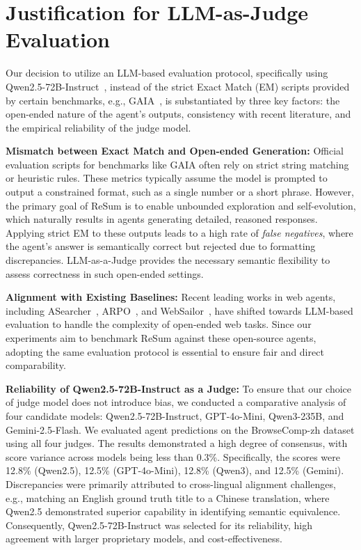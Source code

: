 \clearpage
\newpage

\section{Justification for LLM-as-Judge Evaluation}\label{appendix:llm-as-judge}

Our decision to utilize an LLM-based evaluation protocol, specifically using Qwen2.5-72B-Instruct~\citep{qwen2.5}, instead of the strict Exact Match (EM) scripts provided by certain benchmarks, e.g., GAIA~\citep{mialon2023gaia}, is substantiated by three key factors: the open-ended nature of the agent's outputs, consistency with recent literature, and the empirical reliability of the judge model.

\textbf{Mismatch between Exact Match and Open-ended Generation:} Official evaluation scripts for benchmarks like GAIA often rely on strict string matching or heuristic rules. These metrics typically assume the model is prompted to output a constrained format, such as a single number or a short phrase. However, the primary goal of ReSum is to enable unbounded exploration and self-evolution, which naturally results in agents generating detailed, reasoned responses. Applying strict EM to these outputs leads to a high rate of \textit{false negatives}, where the agent's answer is semantically correct but rejected due to formatting discrepancies. LLM-as-a-Judge provides the necessary semantic flexibility to assess correctness in such open-ended settings.

\textbf{Alignment with Existing Baselines:} Recent leading works in web agents, including ASearcher~\citep{gao2025asearcher}, ARPO~\citep{dong2025arpo}, and WebSailor~\citep{li2025websailor}, have shifted towards LLM-based evaluation to handle the complexity of open-ended web tasks. Since our experiments aim to benchmark ReSum against these open-source agents, adopting the same evaluation protocol is essential to ensure fair and direct comparability.

\textbf{Reliability of Qwen2.5-72B-Instruct as a Judge:} To ensure that our choice of judge model does not introduce bias, we conducted a comparative analysis of four candidate models: Qwen2.5-72B-Instruct, GPT-4o-Mini, Qwen3-235B, and Gemini-2.5-Flash. We evaluated agent predictions on the BrowseComp-zh dataset using all four judges. The results demonstrated a high degree of consensus, with score variance across models being less than 0.3\%. Specifically, the scores were 12.8\% (Qwen2.5), 12.5\% (GPT-4o-Mini), 12.8\% (Qwen3), and 12.5\% (Gemini). Discrepancies were primarily attributed to cross-lingual alignment challenges, e.g., matching an English ground truth title to a Chinese translation, where Qwen2.5 demonstrated superior capability in identifying semantic equivalence. Consequently, Qwen2.5-72B-Instruct was selected for its reliability, high agreement with larger proprietary models, and cost-effectiveness.
